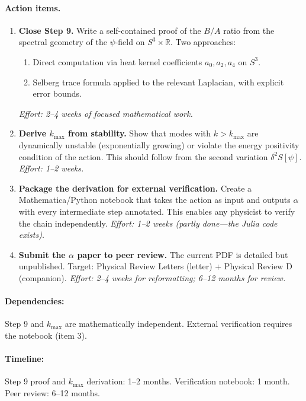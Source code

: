 \documentclass[11pt,a4paper]{article}
\begin{document}
\paragraph{Action items.}
\begin{enumerate}
    \item \textbf{Close Step 9.} Write a self-contained proof of the $B/A$ ratio from the spectral geometry of the $\psi$-field on $S^3 \times \mathbb{R}$. Two approaches:
    \begin{enumerate}[label=(\roman*)]
        \item Direct computation via heat kernel coefficients $a_0, a_2, a_4$ on $S^3$.
        \item Selberg trace formula applied to the relevant Laplacian, with explicit error bounds.
    \end{enumerate}
    \emph{Effort: 2--4 weeks of focused mathematical work.}
    \item \textbf{Derive $k_{\max}$ from stability.} Show that modes with $k > k_{\max}$ are dynamically unstable (exponentially growing) or violate the energy positivity condition of the action. This should follow from the second variation $\delta^2 S[\psi]$. \emph{Effort: 1--2 weeks.}
    \item \textbf{Package the derivation for external verification.} Create a Mathematica/Python notebook that takes the action as input and outputs $\alpha$ with every intermediate step annotated. This enables any physicist to verify the chain independently. \emph{Effort: 1--2 weeks (partly done---the Julia code exists).}
    \item \textbf{Submit the $\alpha$ paper to peer review.} The current PDF is detailed but unpublished. Target: Physical Review Letters (letter) + Physical Review D (companion). \emph{Effort: 2--4 weeks for reformatting; 6--12 months for review.}
\end{enumerate}

\paragraph{Dependencies:} Step 9 and $k_{\max}$ are mathematically independent. External verification requires the notebook (item 3).

\paragraph{Timeline:} Step 9 proof and $k_{\max}$ derivation: 1--2 months. Verification notebook: 1 month. Peer review: 6--12 months.
\end{document}
